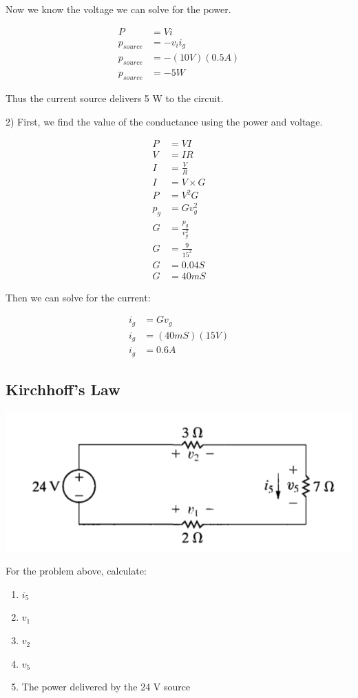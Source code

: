 Now we know the voltage we can solve for the power. 

\begin{align*}
	P &= Vi \\
	p_{source} &= -v_{i}i_{g} \\
	p_{source} &= -(10 V)(0.5 A) \\
	p_{source} &= -5 W	
\end{align*}

Thus the current source delivers 5 W to the circuit. 

2) First, we find the value of the conductance using the power and voltage. 

\begin{align*}	
	P &= VI \\
	V &= IR \\
	I &= \frac{V}{R} \\
	I &= V \times G \\
	P &= V^2 G \\
	p_{g} &= Gv_{g}^{2} \\
	G &= \frac{p_g}{v_{g}^{2}} \\
	G &= \frac{9}{15^{2}} \\
	G &= 0.04 S \\
	G &= 40 mS
\end{align*}

Then we can solve for the current:

\begin{align*}
	i_g &= G v_g \\
	i_g &= (40 mS)(15 V) \\
	i_g &= 0.6 A
\end{align*}


\newpage
\subsection{Kirchhoff's Law}
\includegraphics[scale=0.25]{img/c2/p3}

For the problem above, calculate:
\begin{enumerate}
	\item $i_5$
	\item $v_1$
	\item $v_2$
	\item $v_5$
	\item The power delivered by the 24 V source
\end{enumerate}


